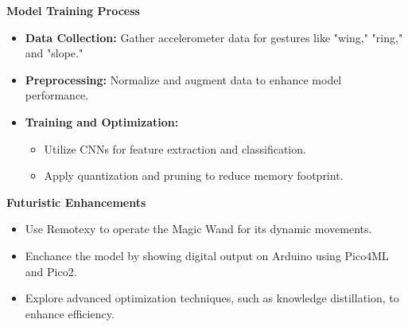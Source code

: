 \begin{frame}
	\begin{block}{\textbf{Model Training Process}}
		\begin{itemize}
			\item \textbf{Data Collection:} Gather accelerometer data for gestures like "wing," "ring," and "slope."
			\item \textbf{Preprocessing:} Normalize and augment data to enhance model performance.
			\item \textbf{Training and Optimization:} 
			\begin{itemize}
				\item Utilize CNNs for feature extraction and classification.
				\item Apply quantization and pruning to reduce memory footprint.
			\end{itemize}
		\end{itemize}
	\end{block}
	
	\begin{block}{\textbf{Futuristic Enhancements}}
		\begin{itemize}
			\item Use Remotexy to operate the Magic Wand for its dynamic movements.
			\item Enchance the model by showing digital output on Arduino using Pico4ML and Pico2.
			\item Explore advanced optimization techniques, such as knowledge distillation, to enhance efficiency.
		\end{itemize}
	\end{block}
\end{frame}

